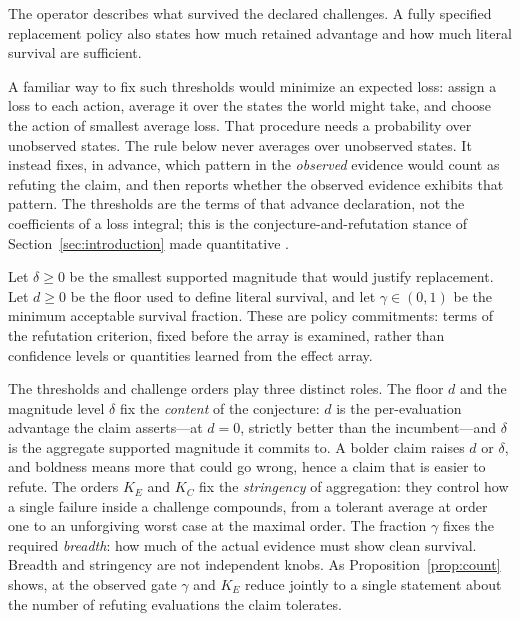 \documentclass[11pt]{article}
\theoremstyle{remark}
\begin{document}
The operator describes what survived the declared challenges. A fully
specified replacement policy also states how much retained advantage and how
much literal survival are sufficient.

A familiar way to fix such thresholds would minimize an expected loss: assign a
loss to each action, average it over the states the world might take, and choose
the action of smallest average loss. That procedure needs a probability over
unobserved states. The rule below never averages over unobserved states. It
instead fixes, in advance, which pattern in the \emph{observed} evidence would
count as refuting the claim, and then reports whether the observed evidence
exhibits that pattern. The thresholds are the terms of that advance declaration,
not the coefficients of a loss integral; this is the conjecture-and-refutation
stance of Section~\ref{sec:introduction} made quantitative
\cite{popper1959logic,popper1963conjectures}.

Let $\delta\geq0$ be the smallest supported magnitude that would justify
replacement. Let $d\geq0$ be the floor used to define literal survival, and
let $\gamma\in(0,1)$ be the minimum acceptable survival fraction. These are
policy commitments: terms of the refutation criterion, fixed before the array
is examined, rather than confidence levels or quantities learned from the
effect array.

The thresholds and challenge orders play three distinct roles. The floor $d$
and the magnitude level $\delta$ fix the \emph{content} of the conjecture: $d$
is the per-evaluation advantage the claim asserts---at $d=0$, strictly better
than the incumbent---and $\delta$ is the aggregate supported magnitude it
commits to. A bolder claim raises $d$ or $\delta$, and boldness means more that
could go wrong, hence a claim that is easier to refute. The orders $K_E$ and
$K_C$ fix the \emph{stringency} of aggregation: they control how a single
failure inside a challenge compounds, from a tolerant average at order one to an
unforgiving worst case at the maximal order. The fraction $\gamma$ fixes the
required \emph{breadth}: how much of the actual evidence must show clean
survival. Breadth and stringency are not independent knobs. As
Proposition~\ref{prop:count} shows, at the observed gate $\gamma$ and $K_E$
reduce jointly to a single statement about the number of refuting evaluations
the claim tolerates.
\end{document}
